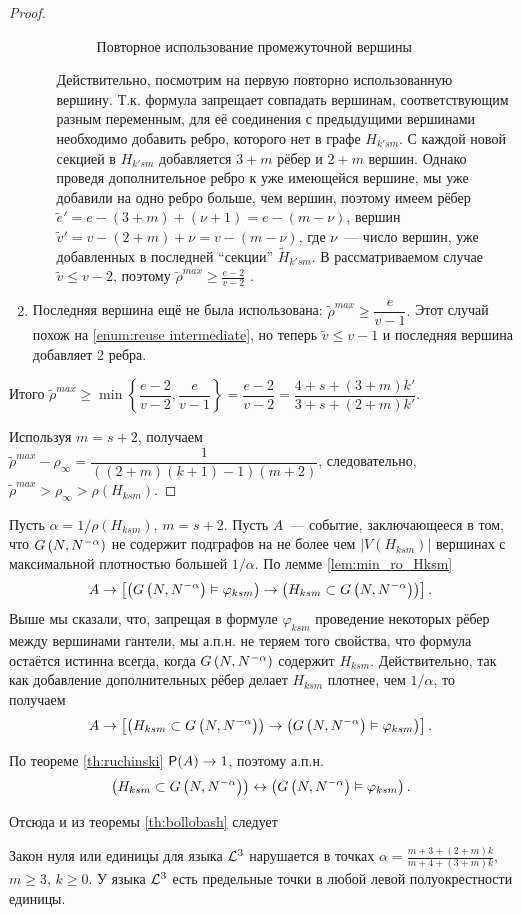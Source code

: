 \begin{proof}
\begin{enumerate}
\begin{enumerate}
\begin{figure}
  \caption{Повторное использование промежуточной вершины}
  \label{fig:reuse intermediate}
\end{figure}
\label{enum:reuse intermediate}
Действительно, посмотрим на первую повторно использованную вершину.
Т.к. формула запрещает совпадать вершинам, соответствующим разным переменным, для её соединения с предыдущими вершинами необходимо добавить ребро, которого нет в графе $H_{k'sm}$. 
С каждой новой секцией в $H_{k'sm}$ добавляется $3+m$ рёбер  и $2+m$ вершин.
Однако проведя дополнительное ребро к уже имеющейся вершине, мы уже добавили на одно ребро больше, чем вершин, поэтому имеем рёбер $ \tilde e' = e - (3+m) + (\nu+1) = e - (m-\nu) $, вершин $\tilde v' = v - (2+m) + \nu = v - (m-\nu)$, где $\nu$~--- число вершин, уже добавленных в последней ``секции'' $\tilde H_{k'sm}$.
В рассматриваемом случае $\tilde v \leq v-2$, поэтому $\tilde \rho^{max} \geq \frac{e-2}{v-2}$ .
\end{enumerate}
\item
Последняя вершина ещё не была использована:
$\tilde \rho^{max} \geq \dfrac{e}{v-1}.$
Этот случай похож на \ref{enum:reuse intermediate}, но теперь $\tilde v \leq v-1$ и последняя вершина добавляет 2 ребра.
\end{enumerate}

Итого 
$\tilde \rho^{max} \geq \min \left\{\dfrac{e-2}{v-2}, \dfrac{e}{v-1}\right\} = \dfrac{e-2}{v-2} = \dfrac{4+s +(3+m)k'}{3+s + (2+m)k'}$. 

Используя $m=s+2$, получаем $\tilde \rho^{max} - \rho_\infty = \dfrac{1}{((2+m)(k+1)-1)(m+2)}$, следовательно,
$\tilde \rho^{max} > \rho_\infty > \rho(H_{ksm}) $.

\end{proof}

Пусть $\alpha = 1/\rho(H_{ksm})$, $m=s+2$.
Пусть  $A$~--- событие, заключающееся в том, что $\Gna$ не содержит подграфов на не более чем $|V(H_{ksm})|$ вершинах с максимальной плотностью большей $1/\alpha$.
По лемме \ref{lem:min_ro_Hksm}
\[
A \rightarrow \left[\left(\Gna \vDash \varphi_{ksm} \right) \rightarrow \left(H_{ksm} \subset \Gna \right) \right] .
\]
Выше мы сказали, что, запрещая в формуле $\varphi_{ksm}$ проведение некоторых рёбер между вершинами гантели, мы а.п.н. не теряем того свойства, что формула остаётся истинна всегда, когда $\Gna$ содержит $H_{ksm}$.
Действительно, так как добавление дополнительных рёбер делает $H_{ksm}$ плотнее, чем $1/\alpha$, то получаем
\[
A \rightarrow \left[\left(H_{ksm} \subset \Gna \right) \rightarrow \left(\Gna \vDash \varphi_{ksm} \right)  \right] .
\]
 
По  теореме \ref{th:ruchinski} $\P(A) \rightarrow 1$, поэтому а.п.н. 
\[\left(H_{ksm} \subset \Gna \right) \leftrightarrow \left(\Gna \vDash \varphi_{ksm} \right).\]

Отсюда и из теоремы \ref{th:bollobash} следует

\begin{theorem}
\label{th:my limiting points}
 Закон нуля или единицы для языка $\LL^3$ нарушается в точках $\alpha = \frac{m+3 + (2+m)k}{m+4 + (3+m)k}$, $m \geq 3$, $k \geq 0$.
У языка $\LL^3$ есть предельные точки в любой левой полуокрестности единицы.
\end{theorem}